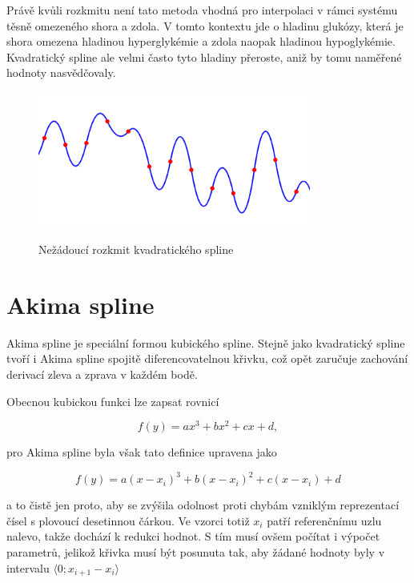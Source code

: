 \documentclass[]{thesiskiv}
\begin{document}
Právě kvůli rozkmitu není tato metoda vhodná pro interpolaci v rámci systému těsně omezeného shora a zdola. V tomto kontextu jde o hladinu glukózy, která je shora omezena hladinou hyperglykémie a zdola naopak hladinou hypoglykémie. Kvadratický spline ale velmi často tyto hladiny přeroste, aniž by tomu naměřené hodnoty nasvědčovaly.

\begin{figure}[ht]
	\centering
	\includegraphics[width=0.8\textwidth]{img/rozkmit.png}\label{img:rozkmit}
	\caption{Nežádoucí rozkmit kvadratického spline}
\end{figure}

\section{Akima spline}

Akima spline je speciální formou kubického spline. Stejně jako kvadratický spline tvoří i Akima spline spojitě diferencovatelnou křivku, což opět zaručuje zachování derivací zleva a zprava v každém bodě.

Obecnou kubickou funkci lze zapsat rovnicí

\begin{equation}\label{eq:cubic}
f(y)=ax^3+bx^2+cx+d,
\end{equation}

pro Akima spline byla však tato definice upravena jako

\begin{equation}
f(y)=a(x-x_i)^3+b(x-x_i)^2+c(x-x_i)+d
\end{equation}

a to čistě jen proto, aby se zvýšila odolnost proti chybám vzniklým reprezentací čísel s plovoucí desetinnou čárkou. Ve vzorci totiž $x_i$ patří referenčnímu uzlu nalevo, takže dochází k redukci hodnot. S tím musí ovšem počítat i výpočet parametrů, jelikož křivka musí být posunuta tak, aby žádané hodnoty byly v intervalu $\langle0 ; x_{i+1} - x_i \rangle$
\end{document}
